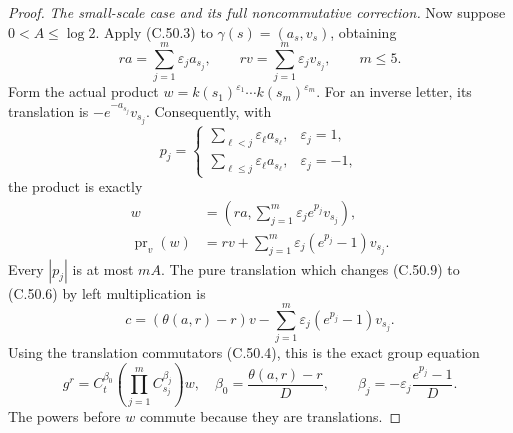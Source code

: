 \begin{proof}
\emph{The small-scale case and its full noncommutative correction.}
Now suppose $0<A\leq\log2$.
Apply (C.50.3) to
$\gamma(s)=(a_s,v_s)$, obtaining
\[
       ra=\sum_{j=1}^{m}\varepsilon_j a_{s_j},\qquad
       rv=\sum_{j=1}^{m}\varepsilon_j v_{s_j},
                         \qquad m\leq5.                 \tag{C.50.7}
\]
Form the actual product
$w=k(s_1)^{\varepsilon_1}\cdots k(s_m)^{\varepsilon_m}$.
For an inverse letter, its translation is
$-e^{-a_{s_j}}v_{s_j}$.
Consequently, with
\[
 p_j=
 \begin{cases}
  \sum_{\ell<j}\varepsilon_\ell a_{s_\ell},
                                       &\varepsilon_j=1,\\
  \sum_{\ell\leq j}\varepsilon_\ell a_{s_\ell},
                                       &\varepsilon_j=-1,
 \end{cases}
                                                        \tag{C.50.8}
\]
the product is exactly
\[
 \begin{split}
 w&=\left(ra,\sum_{j=1}^{m}
                    \varepsilon_j e^{p_j}v_{s_j}\right),\\
 \operatorname{pr}_v(w)
   &=rv+\sum_{j=1}^{m}
             \varepsilon_j(e^{p_j}-1)v_{s_j}.
 \end{split}                                            \tag{C.50.9}
\]
Every $|p_j|$ is at most $mA$.
The pure translation which changes (C.50.9) to (C.50.6)
by left multiplication is
\[
 c=(\theta(a,r)-r)v
       -\sum_{j=1}^{m}
                  \varepsilon_j(e^{p_j}-1)v_{s_j}.
                                                        \tag{C.50.10}
\]
Using the translation commutators (C.50.4), this is the
exact group equation
\[
 g^r=C_t^{\beta_0}
          \left(\prod_{j=1}^{m}C_{s_j}^{\beta_j}\right)w,
 \quad
 \beta_0=\frac{\theta(a,r)-r}{D},\qquad
 \beta_j=-\varepsilon_j\frac{e^{p_j}-1}{D}.
                                                        \tag{C.50.11}
\]
The powers before $w$ commute because they are translations.


\end{proof}
